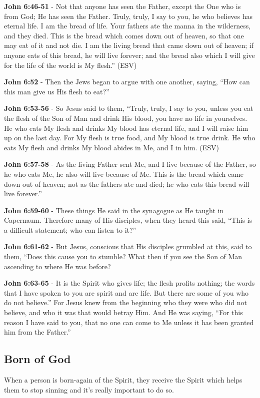 \documentclass[11pt]{article}
\begin{document}
\textbf{John 6:46-51} - Not that anyone has seen the Father, except the One who is from God; He has seen the Father. Truly, truly, I say to you, he who believes has eternal life. I am the bread of life. Your fathers ate the manna in the wilderness, and they died. This is the bread which comes down out of heaven, so that one may eat of it and not die. I am the living bread that came down out of heaven; if anyone eats of this bread, he will live forever; and the bread also which I will give for the life of the world is My flesh.” (ESV)

\textbf{John 6:52} - Then the Jews began to argue with one another, saying, “How can this man give us His flesh to eat?”

\textbf{John 6:53-56} - So Jesus said to them, “Truly, truly, I say to you, unless you eat the flesh of the Son of Man and drink His blood, you have no life in yourselves. He who eats My flesh and drinks My blood has eternal life, and I will raise him up on the last day. For My flesh is true food, and My blood is true drink. He who eats My flesh and drinks My blood abides in Me, and I in him. (ESV)

\textbf{John 6:57-58} - As the living Father sent Me, and I live because of the Father, so he who eats Me, he also will live because of Me. This is the bread which came down out of heaven; not as the fathers ate and died; he who eats this bread will live forever.”

\textbf{John 6:59-60} - These things He said in the synagogue as He taught in Capernaum. Therefore many of His disciples, when they heard this said, “This is a difficult statement; who can listen to it?”

\textbf{John 6:61-62} - But Jesus, conscious that His disciples grumbled at this, said to them, “Does this cause you to stumble? What then if you see the Son of Man ascending to where He was before?

\textbf{John 6:63-65} - It is the Spirit who gives life; the flesh profits nothing; the words that I have spoken to you are spirit and are life. But there are some of you who do not believe.” For Jesus knew from the beginning who they were who did not believe, and who it was that would betray Him. And He was saying, “For this reason I have said to you, that no one can come to Me unless it has been granted him from the Father.”

\subsection{Born of God}
\label{sec:orgea19ccc}
When a person is born-again of the Spirit, they receive the Spirit which helps them to stop sinning and it's really important to do so.
\end{document}
